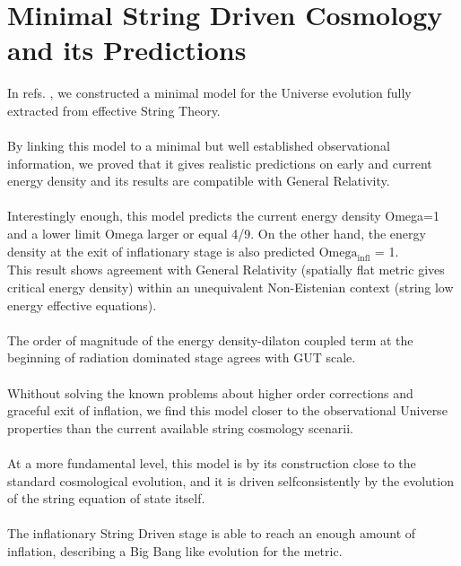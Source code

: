 \documentclass[12pt,a4paper]{article}
\begin{document}
\section{Minimal String Driven Cosmology and its Predictions}
In refs. \cite{is1}, \cite{is2} we constructed a minimal model for the Universe evolution fully extracted from
effective String Theory. \\ \\
By linking this model to a minimal but well established observational 
information, we proved that it gives realistic predictions on early and current energy density and its results are compatible with General Relativity. \\ \\
Interestingly enough, this model predicts the current energy density 
Omega=1 
and a lower limit Omega larger or equal 4/9. On the other hand, 
the energy density at the exit of inflationary stage is also predicted 
$\mathrm{Omega} _{\mathrm{infl}}$ = 1.\\
This result shows  agreement with General Relativity (spatially flat metric 
gives critical energy density) within an unequivalent Non-Eistenian context 
(string low energy effective equations).\\ \\
The order of magnitude of the energy density-dilaton coupled term at the 
beginning of radiation dominated stage agrees with GUT scale.\\ \\
Whithout solving the known problems about higher order corrections and 
graceful exit of inflation, we find this model closer to the observational 
Universe properties than the current available string cosmology scenarii.\\ \\
At a more fundamental level, this model is by its construction close to the 
standard cosmological evolution, and it is driven selfconsistently by the 
evolution of the string equation of state itself. \\ \\
The inflationary String Driven stage is able to reach an enough amount of 
inflation, describing a Big Bang like evolution for the metric.\\
\end{document}
